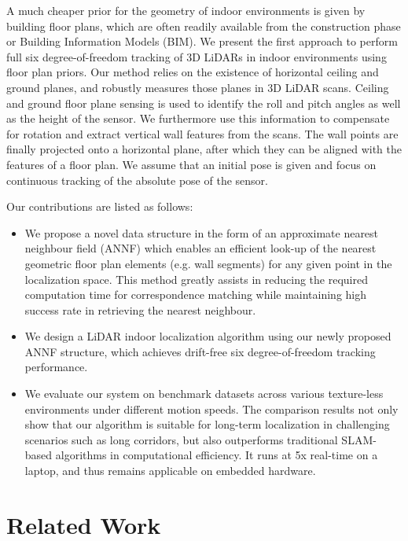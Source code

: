 \documentclass[letterpaper, 10 pt, conference]{ieeeconf}  %
\begin{document}
A much cheaper prior for the geometry of indoor environments is given by building floor plans, which are often readily available from the construction phase or Building Information Models (BIM). We present the first approach to perform full six degree-of-freedom tracking of 3D LiDARs in indoor environments using floor plan priors. Our method relies on the existence of horizontal ceiling and ground planes, and robustly measures those planes in 3D LiDAR scans. Ceiling and ground floor plane sensing is used to identify the roll and pitch angles as well as the height of the sensor. We furthermore use this information to compensate for rotation and extract vertical wall features from the scans. The wall points are finally projected onto a horizontal plane, after which they can be aligned with the features of a floor plan. We assume that an initial pose is given and focus on continuous tracking of the absolute pose of the sensor.

Our contributions are listed as follows:

\begin{itemize}
    \item We propose a novel data structure in the form of an approximate nearest neighbour field (ANNF) which enables an efficient look-up of the nearest geometric floor plan elements (e.g. wall segments) for any given point in the localization space. This method greatly assists in reducing the required computation time for correspondence matching while maintaining high success rate in retrieving the nearest neighbour.
    \item We design a LiDAR indoor localization algorithm using our newly proposed ANNF structure, which achieves drift-free six degree-of-freedom tracking performance.
    \item We evaluate our system on benchmark datasets across various texture-less environments under different motion speeds. The comparison results not only show that our algorithm is suitable for long-term localization in challenging scenarios such as long corridors, but also outperforms traditional SLAM-based algorithms in computational efficiency. It runs at 5x real-time on a laptop, and thus remains applicable on embedded hardware.
\end{itemize}


\section{Related Work}
\end{document}
